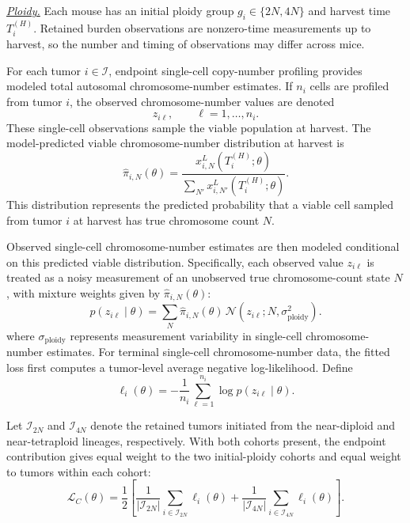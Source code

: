 \documentclass[11pt]{article}
\begin{document}
\underline{\textit{Ploidy.}} Each mouse has an initial ploidy group $g_i\in\{2N,4N\}$ and harvest time $T_i^{(H)}$. Retained burden observations are nonzero-time measurements up to harvest, so the number and timing of observations may differ across mice.

For each tumor $i\in\mathcal I$, endpoint single-cell copy-number profiling provides modeled total autosomal chromosome-number estimates. If $n_i$ cells are profiled from tumor $i$, the observed chromosome-number values are denoted
\begin{equation}
z_{i\ell},\qquad \ell=1,\dots,n_i.
\label{eq:appendix_observed_chromosome_values}
\end{equation}
These single-cell observations sample the viable population at harvest. The model-predicted viable chromosome-number distribution at harvest is
\begin{equation}
\widehat{\pi}_{i,N}(\theta)
=
\frac{
x^{L}_{i,N}(T_i^{(H)};\theta)
}{
\sum_{N'}
x^{L}_{i,N'}(T_i^{(H)};\theta)
}.
\label{eq:appendix_ploidy_distribution}
\end{equation}
This distribution represents the predicted probability that a viable cell sampled from tumor $i$ at harvest has true chromosome count $N$.

Observed single-cell chromosome-number estimates are then modeled conditional on this predicted viable distribution. Specifically, each observed value $z_{i\ell}$ is treated as a noisy measurement of an unobserved true chromosome-count state $N$, with mixture weights given by $\widehat{\pi}_{i,N}(\theta)$:
\begin{equation}
p(z_{i\ell}\mid \theta)
=
\sum_N
\widehat{\pi}_{i,N}(\theta)
\, 
\mathcal N
\!\left(
z_{i\ell};
N,
\sigma_{\mathrm{ploidy}}^2
\right).
\label{eq:appendix_ploidy_likelihood}
\end{equation}
where $\sigma_{\mathrm{ploidy}}$ represents measurement variability in single-cell chromosome-number estimates. For terminal single-cell chromosome-number data, the fitted loss first computes a tumor-level average negative log-likelihood. Define
\begin{equation}
\ell_i(\theta)
=
-\frac{1}{n_i}
\sum_{\ell=1}^{n_i}
\log
p(z_{i\ell}\mid \theta).
\label{eq:appendix_ploidy_loss_tumor}
\end{equation} 

Let $\mathcal I_{2N}$ and $\mathcal I_{4N}$ denote the retained tumors initiated from the near-diploid and near-tetraploid lineages, respectively. With both cohorts present, the endpoint contribution gives equal weight to the two initial-ploidy cohorts and equal weight to tumors within each cohort:
\begin{equation}
\mathcal L_C(\theta)
=
\frac{1}{2}
\left[
\frac{1}{|\mathcal I_{2N}|}
\sum_{i\in\mathcal I_{2N}}\ell_i(\theta)
+
\frac{1}{|\mathcal I_{4N}|}
\sum_{i\in\mathcal I_{4N}}\ell_i(\theta)
\right].
\label{eq:appendix_ploidy_loss}
\end{equation}
\end{document}
